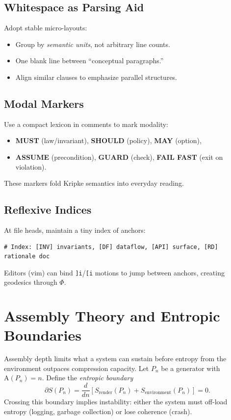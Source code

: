 \documentclass[12pt,a4paper]{article}
\theoremstyle{plain}
\theoremstyle{definition}
\theoremstyle{remark}
\newcommand{\Phifield}{\Phi}
\newcommand{\Sfield}{S}
\newcommand{\AI}{\mathrm{A}}
\begin{document}
\subsection{Whitespace as Parsing Aid}
Adopt stable micro-layouts:
\begin{itemize}
  \item Group by \emph{semantic units}, not arbitrary line counts.
  \item One blank line between “conceptual paragraphs.”
  \item Align similar clauses to emphasize parallel structures.
\end{itemize}

\subsection{Modal Markers}
Use a compact lexicon in comments to mark modality:
\begin{itemize}
  \item \textbf{MUST} (law/invariant), \textbf{SHOULD} (policy), \textbf{MAY} (option),
  \item \textbf{ASSUME} (precondition), \textbf{GUARD} (check), \textbf{FAIL FAST} (exit on violation).
\end{itemize}
These markers fold Kripke semantics into everyday reading.

\subsection{Reflexive Indices}
At file heads, maintain a tiny index of anchors:
\begin{verbatim}
# Index: [INV] invariants, [DF] dataflow, [API] surface, [RD] rationale doc
\end{verbatim}
Editors (vim) can bind \verb|]i|/\verb|[i| motions to jump between anchors, creating geodesics through $\Phifield$.

\section{Assembly Theory and Entropic Boundaries}
\label{sec:assembly-boundaries}

Assembly depth limits what a system can sustain before entropy from the environment outpaces compression capacity. Let $P_n$ be a generator with $\AI(P_n)=n$. Define the \emph{entropic boundary}
\[
\partial \Sfield(P_n)= \frac{d}{d n}\left[\Sfield_{\mathrm{render}}(P_n) + \Sfield_{\mathrm{environment}}(P_n)\right]=0.
\]
Crossing this boundary implies instability: either the system must off-load entropy (logging, garbage collection) or lose coherence (crash).
\end{document}
